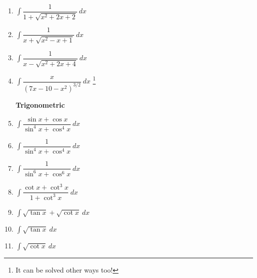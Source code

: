 \documentclass[12pt,a4paper,twoside]{book}
\newcommand{\dint}[1]{\displaystyle{\int #1 \  dx}}
\begin{document}
\begin{multicols}{2}
\begin{enumerate}
\item $\dint{\dfrac{1}{1+\sqrt{x^2+2x+2}}}$
\item $\dint{\dfrac{1}{x+\sqrt{x^2-x+1}}}$
\item $\dint{\dfrac{1}{x-\sqrt{x^2+2x+4}}}$
\item $\dint{\dfrac{x}{(7x-10-x^2)^{3/2}}}$ \footnote{It can be solved other ways too!}
\begin{center}
\textbf{Trigonometric}
\end{center}
\item $\dint{\dfrac{\sin x+\cos x}{\sin ^4 x+\cos ^4 x}}$
\item $\dint{\dfrac{1}{\sin ^4 x+\cos ^4 x}}$
\item $\dint{\dfrac{1}{\sin ^6 x+\cos ^6 x}}$
\item $\dint{\dfrac{\cot x+\cot ^3 x}{1+\cot^3 x}}$
\item $\dint{\sqrt{\tan x}+\sqrt{\cot x}}$
\item $\dint{\sqrt{\tan x}}$
\item $\dint{\sqrt{\cot x}}$

\end{enumerate}
\end{multicols}

\newpage
\end{document}
